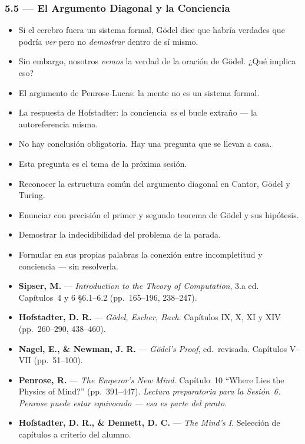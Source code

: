\documentclass[11pt, letterpaper]{article}
\begin{document}
\subsubsection{5.5 --- El Argumento Diagonal y la Conciencia}
\begin{itemize}
  \item Si el cerebro fuera un sistema formal, G\"odel dice que habr\'ia verdades que podr\'ia \emph{ver} pero no \emph{demostrar} dentro de s\'i mismo.
  \item Sin embargo, nosotros \emph{vemos} la verdad de la oraci\'on de G\"odel. ¿Qu\'e implica eso?
  \item El argumento de Penrose-Lucas: la mente no es un sistema formal.
  \item La respuesta de Hofstadter: la conciencia \emph{es} el bucle extra\~no --- la autoreferencia misma.
  \item No hay conclusi\'on obligatoria. Hay una pregunta que se llevan a casa.
  \item Esta pregunta es el tema de la pr\'oxima sesi\'on.
\end{itemize}

\begin{objetivos}
\begin{itemize}
  \item Reconocer la estructura com\'un del argumento diagonal en Cantor, G\"odel y Turing.
  \item Enunciar con precisi\'on el primer y segundo teorema de G\"odel y sus hip\'otesis.
  \item Demostrar la indecidibilidad del problema de la parada.
  \item Formular en sus propias palabras la conexi\'on entre incompletitud y conciencia --- sin resolverla.
\end{itemize}
\end{objetivos}

\begin{lecturas}
\begin{itemize}
  \item[$(\star)$] \textbf{Sipser, M.} --- \emph{Introduction to the Theory of Computation}, 3.a ed. Cap\'itulos~4 y 6 \S6.1--6.2 (pp.\ 165--196, 238--247).
  \item[$(\star)$] \textbf{Hofstadter, D. R.} --- \emph{G\"odel, Escher, Bach}. Cap\'itulos IX, X, XI y XIV (pp.\ 260--290, 438--460).
  \item[$(\star)$] \textbf{Nagel, E., \& Newman, J. R.} --- \emph{G\"odel's Proof}, ed.\ revisada. Cap\'itulos V--VII (pp.\ 51--100).
  \item \textbf{Penrose, R.} --- \emph{The Emperor's New Mind}. Cap\'itulo~10 ``Where Lies the Physics of Mind?'' (pp.\ 391--447). \textit{Lectura preparatoria para la Sesi\'on~6. Penrose puede estar equivocado --- esa es parte del punto.}
  \item \textbf{Hofstadter, D. R., \& Dennett, D. C.} --- \emph{The Mind's I}. Selecci\'on de cap\'itulos a criterio del alumno.
\end{itemize}
\end{lecturas}
\end{document}
